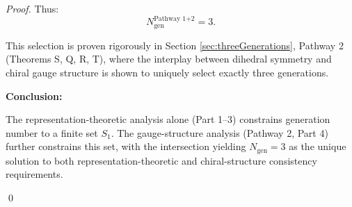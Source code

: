\begin{theorem}
\begin{proof}
Thus:
\begin{equation}
N_{\mathrm{gen}}^{\text{Pathway 1+2}} = 3.
\end{equation}

This selection is proven rigorously in Section \ref{sec:threeGenerations}, Pathway 2 (Theorems S, Q, R, T), where the interplay between dihedral symmetry and chiral gauge structure is shown to uniquely select exactly three generations.

\textbf{Conclusion:}

The representation-theoretic analysis alone (Part 1--3) constrains generation number to a finite set $S_1$. The gauge-structure analysis (Pathway 2, Part 4) further constrains this set, with the intersection yielding $N_{\mathrm{gen}} = 3$ as the unique solution to both representation-theoretic and chiral-structure consistency requirements.

\qed

\end{proof}

\end{theorem}

\vspace{0.5cm}

